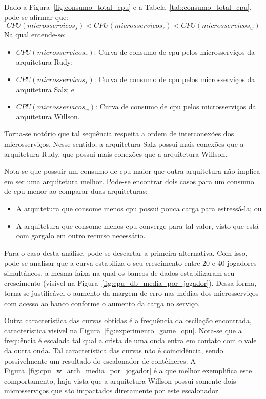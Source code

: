 Dado a Figura~\ref{fig:consumo_total_cpu} e a Tabela~\ref{tab:consumo_total_cpu}, pode-se afirmar que:
\vspace{-0.3cm}
$$
    CPU(microsservicos_{s}) < CPU(microsservicos_{r}) < CPU(microsservicos_{w})
$$
\vspace{-0.3cm}
Na qual entende-se:
\vspace{-0.3cm}
\begin{itemize}
\item $CPU(microsservicos_{r})$: Curva de consumo de \ac{cpu} pelos microsserviços da arquitetura Rudy;
\item $CPU(microsservicos_{s})$: Curva de consumo de \ac{cpu} pelos microsserviços da arquitetura Salz; e
\item $CPU(microsservicos_{w})$: Curva de consumo de \ac{cpu} pelos microsserviços da arquitetura Willson.
\end{itemize}

\vspace{-0.3cm}
Torna-se notório que tal sequência respeita a ordem de interconexões dos microsserviços.
%
Nesse sentido, a arquitetura Salz possui mais conexões que a arquitetura Rudy, que possui mais conexões que a arquitetura Willson.

Nota-se que possuir um consumo de \ac{cpu} maior que outra arquitetura não implica em ser uma arquitetura melhor.
%
Pode-se encontrar dois casos para um consumo de \ac{cpu} menor ao comparar duas arquiteturas:

\begin{itemize}
 \item A arquitetura que consome menos \ac{cpu} possui pouca carga para estressá-la; ou
 \item A arquitetura que consome menos \ac{cpu} converge para tal valor, visto que está com gargalo em outro recurso necessário.
\end{itemize}

Para o caso desta análise, pode-se descartar a primeira alternativa.
%
Com isso, pode-se analisar que a curva estabiliza o seu crescimento entre 20 e 40 jogadores simultâneos, a mesma faixa na qual os bancos de dados estabilizaram seu crescimento (visível na Figura~\ref{fig:cpu_db_media_por_jogador}).
%
Dessa forma, torna-se justificável o aumento da margem de erro nas médias dos microsserviços com acesso ao banco conforme o aumento da carga no serviço.

Outra característica das curvas obtidas é a frequência da oscilação encontrada, característica visível na Figura~\ref{fig:experimento_game_cpu}.
%
Nota-se que a frequência é escalada tal qual a crista de uma onda entra em contato com o vale da outra onda.
%
Tal característica das curvas não é coincidência, sendo possivelmente um resultado do escalonador de contêineres.
%
A Figura~\ref{fig:cpu_w_arch_media_por_jogador} é a que melhor exemplifica este comportamento, haja vista que a arquitetura Willson possui somente dois microsserviços que são impactados diretamente por este escalonador.


